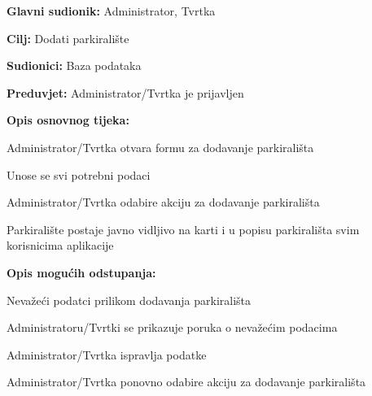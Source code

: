 \noindent {}
\begin{packed_item}

	\item \textbf{Glavni sudionik:} Administrator, Tvrtka
	\item \textbf{Cilj:} Dodati parkiralište
	\item \textbf{Sudionici:} Baza podataka
	\item \textbf{Preduvjet:} Administrator/Tvrtka je prijavljen
	\item \textbf{Opis osnovnog tijeka:}
	
	\item[] \begin{packed_enum}
		
		\item Administrator/Tvrtka otvara formu za dodavanje parkirališta
		\item Unose se svi potrebni podaci
		\item Administrator/Tvrtka odabire akciju za dodavanje parkirališta
		\item Parkiralište postaje javno vidljivo na karti i u popisu parkirališta svim korisnicima aplikacije

	\end{packed_enum}
	
	\item  \textbf{Opis mogućih odstupanja:}
	
	\item[] \begin{packed_item}
		
		\item[6.a] Nevažeći podatci prilikom dodavanja parkirališta
		\item[] \begin{packed_enum}
			
			\item Administratoru/Tvrtki se prikazuje poruka o nevažećim podacima
			\item Administrator/Tvrtka ispravlja podatke
			\item Administrator/Tvrtka ponovno odabire akciju za dodavanje parkirališta
			
		\end{packed_enum}
		
	\end{packed_item}
\end{packed_item}

